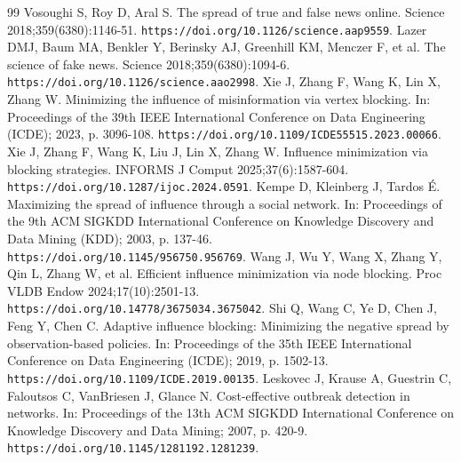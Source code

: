 \documentclass[preprint,11pt]{elsarticle}
\theoremstyle{definition}
\theoremstyle{remark}
\begin{document}
\begin{thebibliography}{99}
\providecommand{\natexlab}[1]{#1}
\providecommand{\url}[1]{\texttt{#1}}
Vosoughi S, Roy D, Aral S. The spread of true and false news online. Science 2018;359(6380):1146-51. \url{https://doi.org/10.1126/science.aap9559}.
Lazer DMJ, Baum MA, Benkler Y, Berinsky AJ, Greenhill KM, Menczer F, et al. The science of fake news. Science 2018;359(6380):1094-6. \url{https://doi.org/10.1126/science.aao2998}.
Xie J, Zhang F, Wang K, Lin X, Zhang W. Minimizing the influence of misinformation via vertex blocking. In: Proceedings of the 39th IEEE International Conference on Data Engineering (ICDE); 2023, p. 3096-108. \url{https://doi.org/10.1109/ICDE55515.2023.00066}.
Xie J, Zhang F, Wang K, Liu J, Lin X, Zhang W. Influence minimization via blocking strategies. INFORMS J Comput 2025;37(6):1587-604. \url{https://doi.org/10.1287/ijoc.2024.0591}.
Kempe D, Kleinberg J, Tardos É. Maximizing the spread of influence through a social network. In: Proceedings of the 9th ACM SIGKDD International Conference on Knowledge Discovery and Data Mining (KDD); 2003, p. 137-46. \url{https://doi.org/10.1145/956750.956769}.
Wang J, Wu Y, Wang X, Zhang Y, Qin L, Zhang W, et al. Efficient influence minimization via node blocking. Proc VLDB Endow 2024;17(10):2501-13. \url{https://doi.org/10.14778/3675034.3675042}.
Shi Q, Wang C, Ye D, Chen J, Feng Y, Chen C. Adaptive influence blocking: Minimizing the negative spread by observation-based policies. In: Proceedings of the 35th IEEE International Conference on Data Engineering (ICDE); 2019, p. 1502-13. \url{https://doi.org/10.1109/ICDE.2019.00135}.
Leskovec J, Krause A, Guestrin C, Faloutsos C, VanBriesen J, Glance N. Cost-effective outbreak detection in networks. In: Proceedings of the 13th ACM SIGKDD International Conference on Knowledge Discovery and Data Mining; 2007, p. 420-9. \url{https://doi.org/10.1145/1281192.1281239}.

\end{thebibliography}
\end{document}

